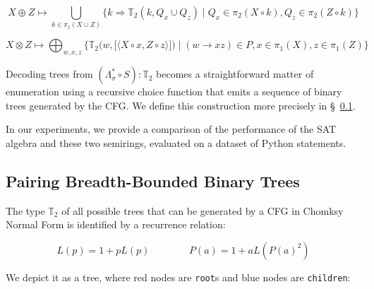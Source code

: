 \documentclass[sigplan,nonacm]{acmart}\settopmatter{printfolios=false,printccs=false,printacmref=false}
\begin{document}
  \begin{footnotesize}
\begin{equation*}
  X \oplus Z \mapsto \bigcup_{k\in \pi_1(X \cup Z)}\big\{k \Rightarrow \mathbb{T}_2(k, Q_x \cup Q_z) \mid Q_x \in \pi_2(X\circ k), Q_z \in \pi_2(Z\circ k)\big\}
\end{equation*}

\begin{equation*}
  X \otimes Z \mapsto \bigoplus_{w, x, z}\Big\{\mathbb{T}_2\big(w, \big[\langle X\circ x, Z\circ z\rangle\big]\big) \mid (w\rightarrow xz) \in P, x \in \pi_1(X), z \in \pi_1(Z)\Big\}
\end{equation*}
\end{footnotesize}

Decoding trees from $(\Lambda_\sigma^* \circ S): \mathbb{T}_2$ becomes a straightforward matter of enumeration using a recursive choice function that emits a sequence of binary trees generated by the CFG. We define this construction more precisely in \S~\ref{sec:pairing}.


In our experiments, we provide a comparison of the performance of the SAT algebra and these two semirings, evaluated on a dataset of Python statements.

\pagebreak\subsection{Pairing Breadth-Bounded Binary Trees}\label{sec:pairing}

The type $\mathbb{T}_2$ of all possible trees that can be generated by a CFG in Chomksy Normal Form is identified by a recurrence relation:

\begin{equation*}
  L(p) = 1 + p L(p) \phantom{addspace} P(a) = 1 + a L(P(a)^2)
\end{equation*}

  We depict it as a tree, where red nodes are \texttt{root}s and blue nodes are \texttt{children}:
\end{document}
